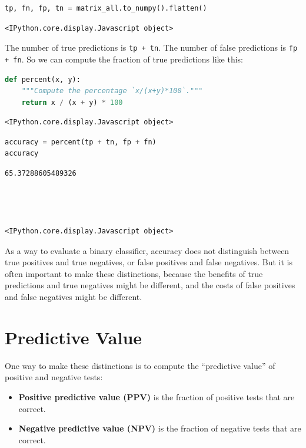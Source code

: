 \begin{lstlisting}[language=Python,style=source]
tp, fn, fp, tn = matrix_all.to_numpy().flatten()
\end{lstlisting}

\begin{lstlisting}[style=output]
<IPython.core.display.Javascript object>
\end{lstlisting}

The number of true predictions is \passthrough{\lstinline!tp + tn!}. The
number of false predictions is \passthrough{\lstinline!fp + fn!}. So we
can compute the fraction of true predictions like this:

\begin{lstlisting}[language=Python,style=source]
def percent(x, y):
    """Compute the percentage `x/(x+y)*100`."""
    return x / (x + y) * 100
\end{lstlisting}

\begin{lstlisting}[style=output]
<IPython.core.display.Javascript object>
\end{lstlisting}

\begin{lstlisting}[language=Python,style=source]
accuracy = percent(tp + tn, fp + fn)
accuracy
\end{lstlisting}

\begin{lstlisting}[style=output]
65.37288605489326




<IPython.core.display.Javascript object>
\end{lstlisting}

As a way to evaluate a binary classifier, accuracy does not distinguish
between true positives and true negatives, or false positives and false
negatives. But it is often important to make these distinctions, because
the benefits of true predictions and true negatives might be different,
and the costs of false positives and false negatives might be different.

\hypertarget{predictive-value}{%
\section{Predictive Value}\label{predictive-value}}

One way to make these distinctions is to compute the ``predictive
value'' of positive and negative tests:

\begin{itemize}
\item
  \textbf{Positive predictive value (PPV)} is the fraction of positive
  tests that are correct.
\item
  \textbf{Negative predictive value (NPV)} is the fraction of negative
  tests that are correct.
\end{itemize}


